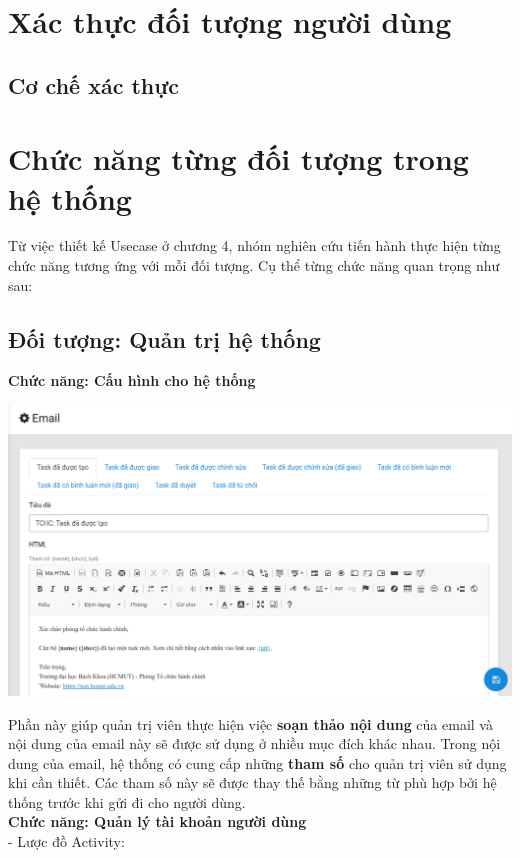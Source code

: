 \section{Xác thực đối tượng người dùng}
\subsection{Cơ chế xác thực}
\section{Chức năng từng đối tượng trong hệ thống}
Từ việc thiết kế Usecase ở chương 4, nhóm nghiên cứu tiến hành thực hiện từng chức năng tương ứng với mỗi đối tượng. Cụ thể từng chức năng quan trọng như sau:
\subsection{Đối tượng: Quản trị hệ thống}
\textbf{Chức năng: Cấu hình cho hệ thống}
\begin{center}
  \captionsetup{type=figure}
  \includegraphics[scale=0.5]{img/Screen/email.png}
\end{center}
Phần này giúp quản trị viên thực hiện việc \textbf{soạn thảo nội dung} của email và nội dung của email này sẽ được sử dụng ở nhiều mục đích khác nhau. Trong nội dung của email, hệ thống có cung cấp những \textbf{tham số} cho quản trị viên sử dụng khi cần thiết. Các tham số này sẽ được thay thế bằng những từ phù hợp bởi hệ thống trước khi gửi đi cho người dùng.\\
\textbf{Chức năng: Quản lý tài khoản người dùng}\\
 - Lược đồ Activity:
